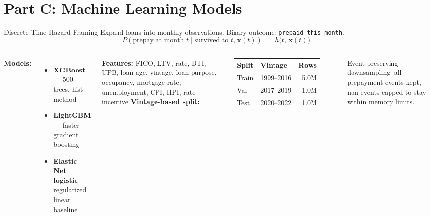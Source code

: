 \documentclass[aspectratio=169]{beamer}
\begin{document}
\section{Part C: Machine Learning Models}

\begin{frame}{Discrete-Time Hazard Framing}
  Expand loans into monthly observations. Binary outcome: \texttt{prepaid\_this\_month}.
  \[
    P(\text{prepay at month } t \mid \text{survived to } t,\, \mathbf{x}(t))
    \;=\; h\bigl(t,\,\mathbf{x}(t)\bigr)
  \]
  \begin{columns}
      \textbf{Models:}
      \begin{itemize}
        \item \textbf{XGBoost} — 500 trees, hist method
        \item \textbf{LightGBM} — faster gradient boosting
        \item \textbf{Elastic Net logistic} — regularized linear baseline
      \end{itemize}
      \vspace{0.3em}
      \textbf{Features:} FICO, LTV, rate, DTI, UPB, loan age,
        vintage, loan purpose, occupancy,
        mortgage rate, unemployment, CPI, HPI, \alert{rate incentive}
      \textbf{Vintage-based split:}
      \begin{table}
        \small
        \begin{tabular}{llr}
          \toprule
          Split & Vintage & Rows \\
          \midrule
          Train & 1999–2016 & 5.0M \\
          Val   & 2017–2019 & 1.0M \\
          Test  & 2020–2022 & 1.0M \\
          \bottomrule
        \end{tabular}
      \end{table}
      \vspace{0.3em}
      {\small Event-preserving downsampling: all prepayment events kept,
      non-events capped to stay within memory limits.}
  \end{columns}
\end{frame}
\end{document}

